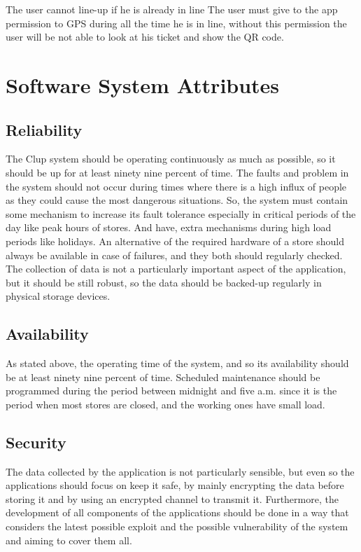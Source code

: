 The user cannot line-up if he is already in line
 The user must give to the app permission to GPS during all the time he is in line, without this permission the user will be not able to look at his ticket and show the QR code.


\section{Software System Attributes}

\subsection{Reliability}
The Clup system should be operating continuously as much as possible, so it should be up for at least ninety nine percent of time. The faults and problem in the system should not occur during times where there is a high influx of people as they could cause the most dangerous situations. So, the system must contain some mechanism to increase its fault tolerance especially in critical periods of the day like peak hours of stores. And have, extra mechanisms during high load periods like holidays. An alternative of the required hardware of a store should always be available in case of failures, and they both should regularly checked.
 The collection of data is not a particularly important aspect of the application, but it should be still robust, so the data should be backed-up regularly in physical storage devices. 

\subsection{Availability}
As stated above, the operating time of the system, and so its availability should be at least ninety nine percent of time. Scheduled maintenance should be programmed during the period between midnight and five a.m. since it is the period when most stores are closed, and the working ones have small load.

\subsection{Security}
The data collected by the application is not particularly sensible, but even so the applications should focus on keep it safe, by mainly encrypting the data before storing it and by using an encrypted channel to transmit it. Furthermore, the development of all components of the applications should be done in a way that considers the latest possible exploit and the possible vulnerability of the system and aiming to cover them all.  

